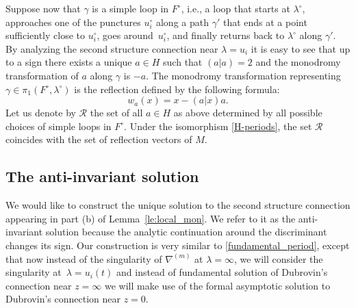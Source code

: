 \documentclass[pdftex]{sigma}
\numberwithin{equation}{section}
\begin{document}
Suppose now that $\gamma$ is a simple loop in $F^\circ$, i.e., a loop
that starts at $\lambda^\circ$,
approaches one of the punctures $u_i^\circ$ along a path $\gamma'$
that ends at a point sufficiently close to $u_i^\circ$, goes around~$u_i^\circ$, and finally returns back to $\lambda^\circ$ along
$\gamma'$. By analyzing the second structure connection near
$\lambda=u_i$ it is easy to see that up to a sign there exists a unique $a\in H$
such that $(a|a)=2$ and the monodromy transformation of $a$ along
$\gamma$ is $-a$. The monodromy transformation representing $\gamma\in
\pi_1(F^\circ,\lambda^\circ)$ is the reflection defined by the
following formula:
\[%
w_a(x)=x-(a|x) a.
\]
Let us denote by $\mathcal{R}$ the set of all $a\in H$ as above determined by
all possible choices of simple loops in $F^\circ$. Under the
isomorphism \eqref{H-periods}, the set $\mathcal{R}$ coincides with
the set of reflection vectors of $M$.

\subsection{The anti-invariant solution}\label{sec:ai_sol}
We would like to construct the unique solution to the second structure
connection appearing in part (b) of Lemma~\ref{le:local_mon}. We refer to
it as the anti-invariant solution because the analytic continuation
around the discriminant changes its sign. Our construction is very
similar to \eqref{fundamental_period}, except that now instead of
the singularity of $\nabla^{(m)}$ at $\lambda=\infty$, we will
consider the singularity at~$\lambda=u_i(t)$ and instead of
fundamental solution of Dubrovin's connection near $z=\infty$ we will
make use of the formal asymptotic solution to Dubrovin's connection
near $z=0$.
\end{document}
